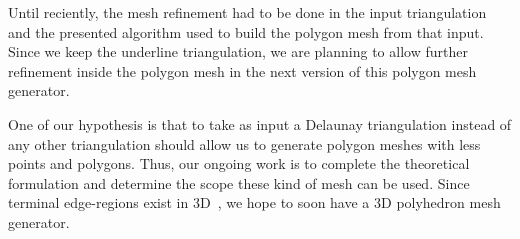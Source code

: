 Until reciently, the mesh refinement had to be done in the input triangulation and the presented algorithm used to build the polygon mesh from that input. Since we keep the underline triangulation, we are planning to allow further refinement inside the polygon mesh in the next version of this polygon mesh generator. 

One of our hypothesis is that to take as input a Delaunay triangulation instead of any other triangulation should allow us to generate polygon meshes with less points and polygons. Thus,  our ongoing work is to complete the theoretical formulation and determine the scope these kind of mesh can be used. Since terminal edge-regions exist in 3D~\cite{HerviasHCF13}, we hope to soon have  a 3D polyhedron mesh generator.










